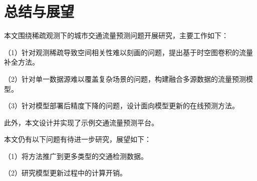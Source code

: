 \chapter{总结与展望}

本文围绕稀疏观测下的城市交通流量预测问题开展研究，主要工作如下：

（1）针对观测稀疏导致空间相关性难以刻画的问题，提出基于时空图卷积的流量补全方法。

（2）针对单一数据源难以覆盖复杂场景的问题，构建融合多源数据的流量预测模型。

（3）针对模型部署后精度下降的问题，设计面向模型更新的在线预测方法。

此外，本文设计并实现了示例交通流量预测平台。

本文仍有以下问题有待进一步研究，展望如下：

（1）将方法推广到更多类型的交通检测数据。

（2）研究模型更新过程中的计算开销。
